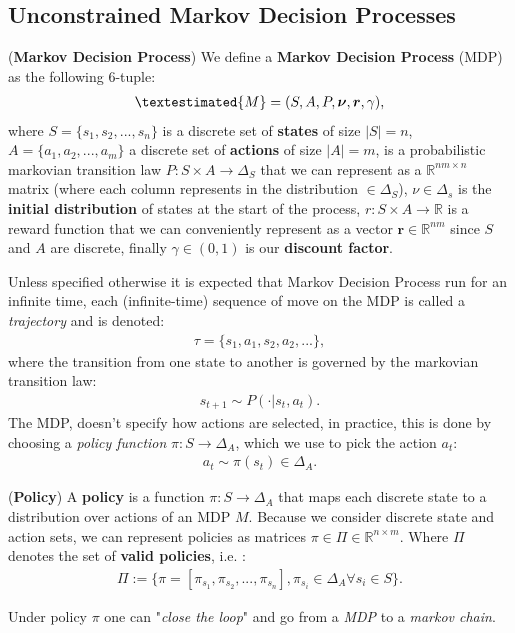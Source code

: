 
\subsection{Unconstrained Markov Decision Processes} \label{sec:unconstrained_mds}
\begin{definition}
    (\textbf{Markov Decision Process})
    We define a \textbf{Markov Decision Process} (MDP) as the following $6$-tuple: 
    \begin{align*}
        \textestimated{M} = (S,A,P,\bm{\nu},\bm{r},\gamma),
    \end{align*}
    where $S = \{s_1,s_2,...,s_n\}$ is a discrete set of \textbf{states} of size $|S| = n$, $A = \{a_1,a_2,...,a_m\}$ a discrete set of \textbf{actions} of size $|A|=m$, is a probabilistic markovian transition law $P:S\times A \rightarrow \Delta_{S}$ that we can represent as a $\mathbb{R}^{nm\times n}$ matrix (where each column represents in the distribution $\in \Delta_S$), $\nu\in \Delta_s$ is the \textbf{initial distribution} of states at the start of the process, $r:S \times A\rightarrow \mathbb{R}$ is a reward function that we can conveniently represent as a vector $\bm{r}\in\mathbb{R}^{nm}$ since $S$ and $A$ are discrete, finally $\gamma\in(0,1)$ is our \textbf{discount factor}. \\
\end{definition}


Unless specified otherwise it is expected that Markov Decision Process run for an infinite time, each (infinite-time) sequence of move on the MDP is called a \textit{trajectory} and is denoted:
\begin{align*}
    \tau = \{s_1,a_1,s_2,a_2,...\},
\end{align*}
\noindent
where the transition from one state to another is governed by the markovian transition law: 
\begin{align*}
    s_{t+1} \sim P(\cdot|s_t,a_t).
\end{align*} 
The MDP, doesn't specify how actions are selected, in practice, this is done by choosing a \textit{policy function} $\pi:S\rightarrow \Delta_A$, which we use to pick the action $a_t$:
\begin{align*}
    a_t \sim \pi(s_t) \in \Delta_A.
\end{align*}

\begin{definition}
    (\textbf{Policy})
    A \textbf{policy} is a function $\pi:S \rightarrow \Delta_A$ that maps each discrete state to a distribution over actions of an MDP $\textit{M}$. Because we consider discrete state and action sets, we can represent policies as matrices $\pi\in \Pi \in \mathbb{R}^{n \times m}$. Where $\Pi$ denotes the set of \textbf{valid policies}, i.e. : 
    \begin{align*}
        \Pi := \Big\{ \pi = [\pi_{s_1},\pi_{s_2},...,\pi_{s_n}], \pi_{s_i}\in \Delta_A \forall s_i \in S \Big\} .
    \end{align*}
\end{definition}
\noindent
Under policy $\pi$ one can "\textit{close the loop}" and go from a \textit{MDP} to a \textit{markov chain}.

